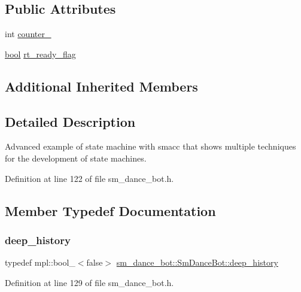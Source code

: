 \subsection*{Public Attributes}
\begin{DoxyCompactItemize}
\item 
int \hyperlink{structsm__dance__bot_1_1SmDanceBot_ab3b8db557ce94d34c60b291911eb140c}{counter\+\_}
\item 
\hyperlink{classbool}{bool} \hyperlink{structsm__dance__bot_1_1SmDanceBot_a0f0587a13670ad8925555cd8f6cb6b2d}{rt\+\_\+ready\+\_\+flag}
\end{DoxyCompactItemize}
\subsection*{Additional Inherited Members}


\subsection{Detailed Description}
Advanced example of state machine with smacc that shows multiple techniques for the development of state machines. 

Definition at line 122 of file sm\+\_\+dance\+\_\+bot.\+h.



\subsection{Member Typedef Documentation}
\mbox{\label{structsm__dance__bot_1_1SmDanceBot_abd58ec4a2b50a45da304a5f0b9c44706}} 
\subsubsection{\texorpdfstring{deep\+\_\+history}{deep\_history}}
{\footnotesize\ttfamily typedef mpl\+::bool\+\_\+$<$false$>$ \hyperlink{structsm__dance__bot_1_1SmDanceBot_abd58ec4a2b50a45da304a5f0b9c44706}{sm\+\_\+dance\+\_\+bot\+::\+Sm\+Dance\+Bot\+::deep\+\_\+history}}



Definition at line 129 of file sm\+\_\+dance\+\_\+bot.\+h.

